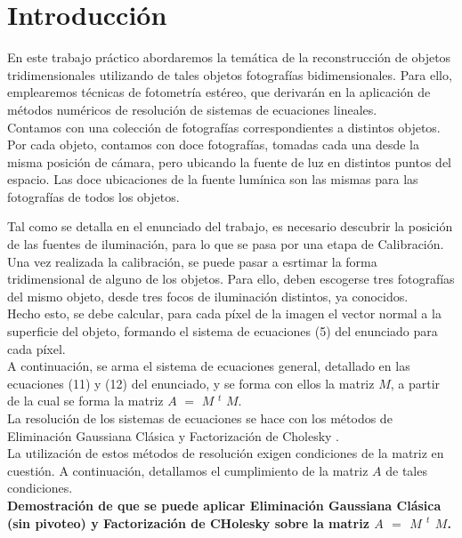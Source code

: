 \section{Introducción}

En este trabajo práctico abordaremos la temática de la reconstrucción de objetos tridimensionales utilizando de tales objetos fotografías bidimensionales. Para ello, emplearemos técnicas de fotometría estéreo, que derivarán en la aplicación de métodos numéricos de resolución de sistemas de ecuaciones lineales.
\\
Contamos con una colección de fotografías correspondientes a distintos objetos. Por cada objeto, contamos con doce fotografías, tomadas cada una desde la misma posición de cámara, pero ubicando la fuente de luz en distintos puntos del espacio. Las doce ubicaciones de la fuente lumínica son las mismas para las fotografías de todos los objetos.

Tal como se detalla en el enunciado del trabajo, es necesario descubrir la posición de las fuentes de iluminación, para lo que se pasa por una etapa de Calibración. 
\\

Una vez realizada la calibración, se puede pasar a esrtimar la forma tridimensional de alguno de los objetos. Para ello, deben escogerse tres fotografías del mismo objeto, desde tres focos de iluminación distintos, ya conocidos.
\\

Hecho esto, se debe calcular, para cada píxel de la imagen el vector normal a la superficie del objeto, formando el sistema de ecuaciones (5) del enunciado para cada píxel.
\\

A continuación, se arma el sistema de ecuaciones general, detallado en las ecuaciones (11) y (12) del enunciado, y se forma con ellos la matriz $M$, a partir de la cual se forma la matriz $A$ $=$ $M$ $^{t}$ $M$. 
\\

La resolución de los sistemas de ecuaciones se hace con los métodos de Eliminación Gaussiana Clásica y Factorización de Cholesky \cite{burden}.
\\
La utilización de estos métodos de resolución exigen condiciones de la matriz en cuestión. A continuación, detallamos el cumplimiento de la matriz $A$ de tales condiciones.
\\

\textbf{Demostración de que se puede aplicar Eliminación Gaussiana Clásica (sin pivoteo) y Factorización de CHolesky sobre la matriz $A$ $=$ $M$ $^{t}$ $M$.}
\\

